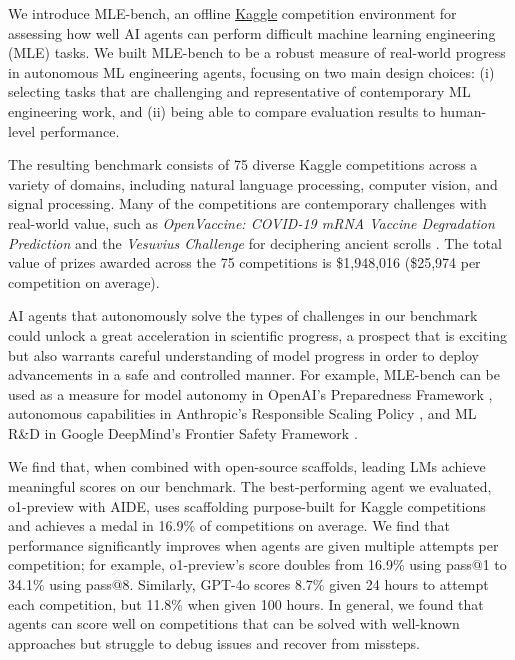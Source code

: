 \documentclass{article} %
\begin{document}
We introduce MLE-bench, an offline \href{https://www.kaggle.com/}{Kaggle} competition environment for assessing how well AI agents can perform difficult machine learning engineering (MLE) tasks. We built MLE-bench to be a robust measure of real-world progress in autonomous ML engineering agents, focusing on two main design choices: (i) selecting tasks that are challenging and representative of contemporary ML engineering work, and (ii) being able to compare evaluation results to human-level performance.

The resulting benchmark consists of 75 diverse Kaggle competitions across a variety of domains, including natural language processing, computer vision, and signal processing.
Many of the competitions are contemporary challenges with real-world value, such as \textit{OpenVaccine: COVID-19 mRNA Vaccine Degradation Prediction} \citep{stanford-covid-vaccine} and the \textit{Vesuvius Challenge} for deciphering ancient scrolls \citep{vesuvius-challenge-ink-detection}. The total value of prizes awarded across the 75 competitions is \$1,948,016 (\$25,974 per competition on average).

AI agents that autonomously solve the types of challenges in our benchmark could unlock a great acceleration in scientific progress, a prospect that is exciting but also warrants careful understanding of model progress in order to deploy advancements in a safe and controlled manner. For example, MLE-bench can be used as a measure for model autonomy in OpenAI’s Preparedness Framework \citep{openai_preparedness_2023}, autonomous capabilities in Anthropic’s Responsible Scaling Policy \citep{anthropic_anthropics_2023}, and ML R\&D in Google DeepMind’s Frontier Safety Framework \citep{google_deepmind_frontier_2024}.

We find that, when combined with open-source scaffolds, leading LMs achieve meaningful scores on our benchmark. The best-performing agent we evaluated, o1-preview with AIDE, uses scaffolding purpose-built for Kaggle competitions and achieves a medal in 16.9\% of competitions on average. We find that performance significantly improves when agents are given multiple attempts per competition; for example, o1-preview's score doubles from 16.9\% using pass@1 to 34.1\% using pass@8. Similarly, GPT-4o scores 8.7\% given 24 hours to attempt each competition, but 11.8\% when given 100 hours. In general, we found that agents can score well on competitions that can be solved with well-known approaches but struggle to debug issues and recover from missteps.
\end{document}
